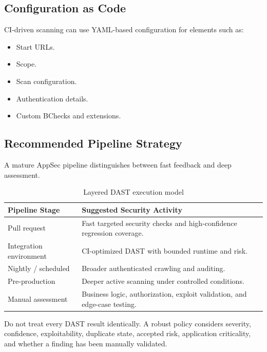 \documentclass[11pt]{article}
\begin{document}
\subsection{Configuration as Code}

CI-driven scanning can use YAML-based configuration for elements such as:

\begin{itemize}
  \item Start URLs.
  \item Scope.
  \item Scan configuration.
  \item Authentication details.
  \item Custom BChecks and extensions.
\end{itemize}

\subsection{Recommended Pipeline Strategy}

A mature AppSec pipeline distinguishes between fast feedback and deep assessment.

\begin{table}[htbp]
\centering
\caption{Layered DAST execution model}
\begin{tabularx}{\textwidth}{@{}lX@{}}
\toprule
\textbf{Pipeline Stage} & \textbf{Suggested Security Activity} \\
\midrule
Pull request & Fast targeted security checks and high-confidence regression coverage. \\
Integration environment & CI-optimized DAST with bounded runtime and risk. \\
Nightly / scheduled & Broader authenticated crawling and auditing. \\
Pre-production & Deeper active scanning under controlled conditions. \\
Manual assessment & Business logic, authorization, exploit validation, and edge-case testing. \\
\bottomrule
\end{tabularx}
\end{table}

\begin{practicebox}
Do not treat every DAST result identically. A robust policy considers severity, confidence, exploitability, duplicate state, accepted risk, application criticality, and whether a finding has been manually validated.
\end{practicebox}
\end{document}
